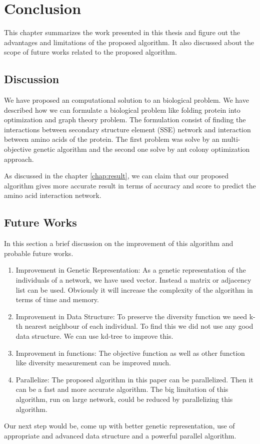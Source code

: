 \chapter{Conclusion}
\label{chap:final}
This chapter summarizes the work presented in this thesis and figure out the advantages and limitations of the proposed algorithm. It also discussed about the scope of future works related to the proposed algorithm.
\section {Discussion}
We have proposed an computational solution to an biological problem. We have described how we can formulate a biological problem like folding protein into optimization and graph theory problem. The formulation consist of finding the interactions between secondary structure element (SSE) network and interaction between amino acids of the protein. The first problem was solve by an multi-objective genetic algorithm and the second one solve by ant colony optimization approach. 

As discussed in the chapter \ref {chap:result}, we can claim that our proposed algorithm gives more accurate result in terms of accuracy and score to predict the amino acid interaction network.
\section {Future Works}
In this section a brief discussion on the improvement of this algorithm and probable future works.
\begin {enumerate}
\item Improvement in Genetic Representation:  As a genetic representation of the individuals of a network, we have used vector. Instead a matrix or adjacency list can be used. Obviously it will increase the complexity of the algorithm in terms of time and memory.
\item Improvement in Data Structure: To preserve the diversity function we need k-th nearest neighbour of each individual. To find this we did not use any good data structure. We can use kd-tree to improve this.
\item Improvement in functions: The objective function as well as other function like diversity measurement can be improved much.
\item Parallelize: The proposed algorithm in this paper can be parallelized. Then it can be a fast and more accurate algorithm. The big limitation of this algorithm, run on large network, could be reduced by parallelizing this algorithm.
\end {enumerate}
Our next step would be, come up with better genetic representation, use of appropriate and advanced data structure and a powerful parallel algorithm.

